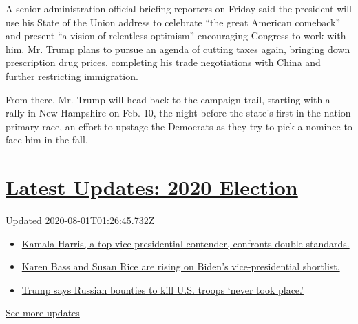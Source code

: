 A senior administration official briefing reporters on Friday said the
president will use his State of the Union address to celebrate ``the
great American comeback'' and present ``a vision of relentless
optimism'' encouraging Congress to work with him. Mr. Trump plans to
pursue an agenda of cutting taxes again, bringing down prescription drug
prices, completing his trade negotiations with China and further
restricting immigration.

From there, Mr. Trump will head back to the campaign trail, starting
with a rally in New Hampshire on Feb. 10, the night before the state's
first-in-the-nation primary race, an effort to upstage the Democrats as
they try to pick a nominee to face him in the fall.

\hypertarget{latest-updates-2020-election}{%
\section{\texorpdfstring{\href{https://www.nytimes.com/2020/07/31/us/elections/biden-vs-trump.html?action=click\&pgtype=Article\&state=default\&region=MAIN_CONTENT_1\&context=storylines_live_updates}{Latest
Updates: 2020
Election}}{Latest Updates: 2020 Election}}\label{latest-updates-2020-election}}

Updated 2020-08-01T01:26:45.732Z

\begin{itemize}
\tightlist
\item
  \href{https://www.nytimes.com/2020/07/31/us/elections/biden-vs-trump.html?action=click\&pgtype=Article\&state=default\&region=MAIN_CONTENT_1\&context=storylines_live_updates\#link-29fdff45}{Kamala
  Harris, a top vice-presidential contender, confronts double
  standards.}
\item
  \href{https://www.nytimes.com/2020/07/31/us/elections/biden-vs-trump.html?action=click\&pgtype=Article\&state=default\&region=MAIN_CONTENT_1\&context=storylines_live_updates\#link-13ec3d9c}{Karen
  Bass and Susan Rice are rising on Biden's vice-presidential
  shortlist.}
\item
  \href{https://www.nytimes.com/2020/07/31/us/elections/biden-vs-trump.html?action=click\&pgtype=Article\&state=default\&region=MAIN_CONTENT_1\&context=storylines_live_updates\#link-49e9a016}{Trump
  says Russian bounties to kill U.S. troops `never took place.'}
\end{itemize}

\href{https://www.nytimes.com/2020/07/31/us/elections/biden-vs-trump.html?action=click\&pgtype=Article\&state=default\&region=MAIN_CONTENT_1\&context=storylines_live_updates}{See
more updates}

